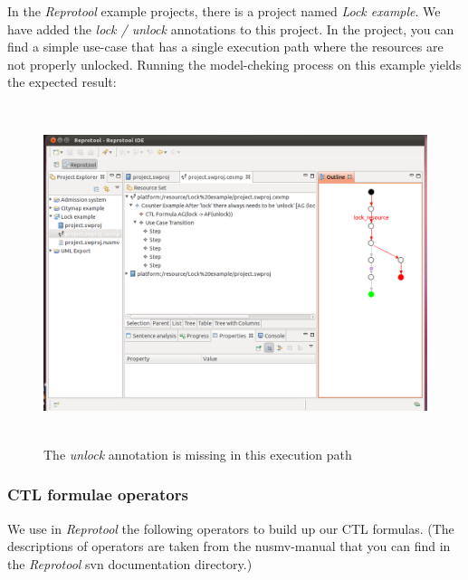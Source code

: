 In the \emph{Reprotool} example projects, there is a project named \emph{Lock example}. We have added the \emph{lock / unlock}
annotations to this project. In the project, you can find a simple use-case that has a single execution path where the resources
are not properly unlocked. Running the model-cheking process on this example yields the expected result:

\begin{figure}[ht]
  \centering
  \includegraphics[height=280pt]{images/reprotoolLockUnlock2}
  \caption{The \emph{unlock} annotation is missing in this execution path}
  \label{fig:reprotoolLockUnlock2}
\end{figure}

\newpage

\subsubsection{CTL formulae operators}
We use in \emph{Reprotool} the following operators to build up our CTL formulas. (The descriptions of operators are taken from
the {nusmv-manual} that you can find in the \emph{Reprotool} svn documentation directory.) 

